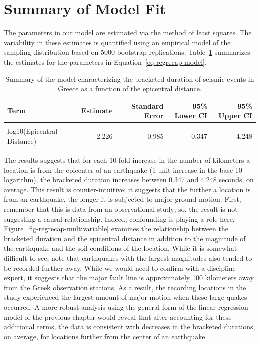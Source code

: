 \documentclass[
  letterpaper,
  DIV=11,
  numbers=noendperiod]{scrreprt}
\theoremstyle{plain}
\theoremstyle{definition}
\theoremstyle{definition}
\theoremstyle{remark}
\begin{document}
\hypertarget{summary-of-model-fit}{%
\section{Summary of Model Fit}\label{summary-of-model-fit}}

The parameters in our model are estimated via the method of least
squares. The variability in these estimates is quantified using an
empirical model of the sampling distribution based on 5000 bootstrap
replications. Table~\ref{tbl-regrecap-model-fit} summarizes the
estimates for the parameters in Equation~\ref{eq-regrecap-model}.

\hypertarget{tbl-regrecap-model-fit}{}
\begin{table}
\caption{\label{tbl-regrecap-model-fit}Summary of the model characterizing the bracketed duration of seismic
events in Greece as a function of the epicentral distance. }\tabularnewline

\centering
\begin{tabular}[t]{lrrrr}
\toprule
Term & Estimate & Standard Error & 95\% Lower CI & 95\% Upper CI\\
\midrule
\cellcolor{gray!6}{(Intercept)} & \cellcolor{gray!6}{2.553} & \cellcolor{gray!6}{1.031} & \cellcolor{gray!6}{0.464} & \cellcolor{gray!6}{4.561}\\
log10(Epicentral Distance) & 2.226 & 0.985 & 0.347 & 4.248\\
\bottomrule
\end{tabular}
\end{table}

The results suggests that for each 10-fold increase in the number of
kilometers a location is from the epicenter of an earthquake (1-unit
increase in the base-10 logarithm), the bracketed duration increases
between 0.347 and 4.248 seconds, on average. This result is
counter-intuitive; it suggests that the further a location is from an
earthquake, the longer it is subjected to major ground motion. First,
remember that this is data from an observational study; so, the result
is not suggesting a causal relationship. Indeed, confounding is playing
a role here. Figure~\ref{fig-regrecap-multivariable} examines the
relationship between the bracketed duration and the epicentral distance
in addition to the magnitude of the earthquake and the soil conditions
of the location. While it is somewhat difficult to see, note that
earthquakes with the largest magnitudes also tended to be recorded
further away. While we would need to confirm with a discipline expert,
it suggests that the major fault line is approximately 100 kilometers
away from the Greek observation stations. As a result, the recording
locations in the study experienced the largest amount of major motion
when these large quakes occurred. A more robust analysis using the
general form of the linear regression model of the previous chapter
would reveal that after accounting for these additional terms, the data
is consistent with decreases in the bracketed durations, on average, for
locations further from the center of an earthquake.
\end{document}
